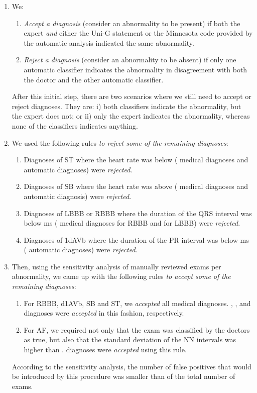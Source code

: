 \documentclass{article}
\begin{document}
\begin{enumerate}
\item We:
\begin{enumerate}
    \item \textit{Accept a diagnosis} (consider an abnormality to be present) if both the expert \emph{and} either the Uni-G statement or the Minnesota code provided by the automatic analysis indicated the same abnormality. 
    \item \textit{Reject a diagnosis} (consider an abnormality to be absent) if only one automatic classifier indicates the abnormality in disagreement with both the doctor and the other automatic classifier. 
\end{enumerate}
After this initial step, there are two scenarios where we still need to accept or reject diagnoses. They are: 
i) both classifiers indicate the abnormality, but the expert does not; or 
ii) only the expert indicates the abnormality, whereas none of the classifiers indicates anything.

\item We used the following rules \textit{to reject some of the remaining diagnoses}:

\begin{enumerate}

    \item Diagnoses of ST where the heart rate was below  ( medical diagnoses and  automatic diagnoses)  were \textit{rejected}. 
    \item Diagnoses of SB where the heart rate was above  ( medical diagnoses and  automatic diagnosis) were \textit{rejected}. 
    \item Diagnoses of LBBB or RBBB where the duration of the QRS interval was below  ms ( medical diagnoses for RBBB and  for LBBB)  were \textit{rejected}. 
    \item Diagnoses of 1dAVb where the duration of the PR interval was below  ms ( automatic diagnoses) were \textit{rejected}.
\end{enumerate}

\item Then, using the sensitivity analysis of  manually reviewed exams per abnormality, we came up with the following rules \textit{to accept some of the remaining diagnoses}:
\begin{enumerate}
    \item For RBBB, d1AVb, SB and ST, we \textit{accepted} all medical diagnoses. , ,  and  diagnoses were \textit{accepted} in this fashion, respectively.
    \item For AF, we required not only that the exam was classified by the doctors as true, but also that the standard deviation of the NN intervals was higher than .  diagnoses were \textit{accepted} using this rule.
\end{enumerate}
According to the sensitivity analysis,  the number of false positives that would be introduced  by this procedure was smaller than  of the total number of exams.


\end{enumerate}
\end{document}
